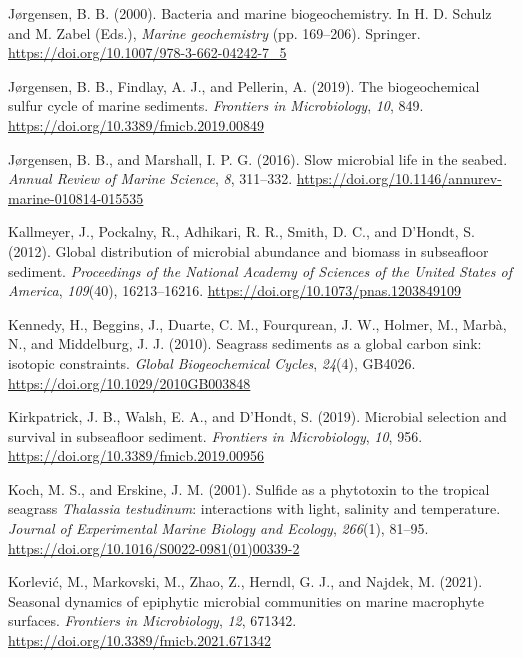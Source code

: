 \documentclass[
  12 pt,
]{book}
\newlength{\cslhangindent}
\newlength{\cslentryspacingunit} %
\newenvironment{CSLReferences}[2] %
 {%
  \setlength{\parindent}{0pt}
  \ifodd #1
  \let\oldpar\par
  \def\par{\hangindent=\cslhangindent\oldpar}
  \fi
  \setlength{\parskip}{#2\cslentryspacingunit}
 }%
 {}
\begin{document}
\begin{CSLReferences}{1}{0}
\leavevmode{}%
Jørgensen, B. B. (2000). Bacteria and marine biogeochemistry. In H. D. Schulz and M. Zabel (Eds.), \emph{Marine geochemistry} (pp. 169--206). Springer. \url{https://doi.org/10.1007/978-3-662-04242-7_5}

\leavevmode{}%
Jørgensen, B. B., Findlay, A. J., and Pellerin, A. (2019). The biogeochemical sulfur cycle of marine sediments. \emph{Frontiers in Microbiology}, \emph{10}, 849. \url{https://doi.org/10.3389/fmicb.2019.00849}

\leavevmode{}%
Jørgensen, B. B., and Marshall, I. P. G. (2016). Slow microbial life in the seabed. \emph{Annual Review of Marine Science}, \emph{8}, 311--332. \url{https://doi.org/10.1146/annurev-marine-010814-015535}

\leavevmode{}%
Kallmeyer, J., Pockalny, R., Adhikari, R. R., Smith, D. C., and D'Hondt, S. (2012). Global distribution of microbial abundance and biomass in subseafloor sediment. \emph{Proceedings of the National Academy of Sciences of the United States of America}, \emph{109}(40), 16213--16216. \url{https://doi.org/10.1073/pnas.1203849109}

\leavevmode{}%
Kennedy, H., Beggins, J., Duarte, C. M., Fourqurean, J. W., Holmer, M., Marbà, N., and Middelburg, J. J. (2010). Seagrass sediments as a global carbon sink: isotopic constraints. \emph{Global Biogeochemical Cycles}, \emph{24}(4), GB4026. \url{https://doi.org/10.1029/2010GB003848}

\leavevmode{}%
Kirkpatrick, J. B., Walsh, E. A., and D'Hondt, S. (2019). Microbial selection and survival in subseafloor sediment. \emph{Frontiers in Microbiology}, \emph{10}, 956. \url{https://doi.org/10.3389/fmicb.2019.00956}

\leavevmode{}%
Koch, M. S., and Erskine, J. M. (2001). Sulfide as a phytotoxin to the tropical seagrass {{{\emph{Thalassia testudinum}}}: interactions with light, salinity and temperature}. \emph{Journal of Experimental Marine Biology and Ecology}, \emph{266}(1), 81--95. \url{https://doi.org/10.1016/S0022-0981(01)00339-2}

\leavevmode{}%
Korlević, M., Markovski, M., Zhao, Z., Herndl, G. J., and Najdek, M. (2021). Seasonal dynamics of epiphytic microbial communities on marine macrophyte surfaces. \emph{Frontiers in Microbiology}, \emph{12}, 671342. \url{https://doi.org/10.3389/fmicb.2021.671342}


\end{CSLReferences}
\end{document}

